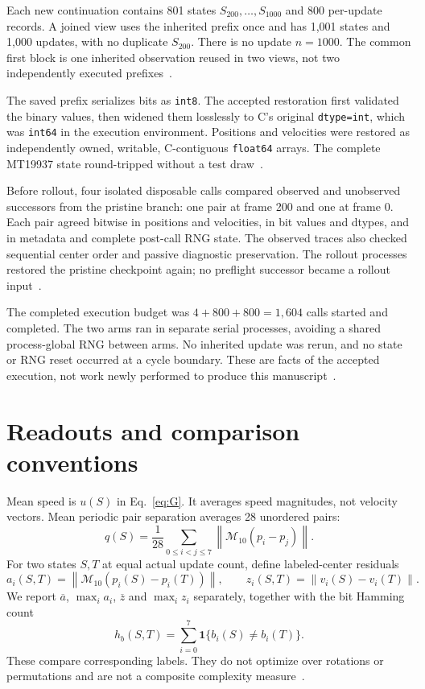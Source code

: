 \documentclass[11pt,a4paper]{article}
\newcommand{\norm}[1]{\left\lVert #1\right\rVert}
\newcommand{\mi}{\mathcal M_{10}}
\begin{document}
Each new continuation contains 801 states $S_{200},\ldots,S_{1000}$ and 800 per-update records. A joined view uses the inherited prefix once and has 1,001 states and 1,000 updates, with no duplicate $S_{200}$. There is no update $n=1000$. The common first block is one inherited observation reused in two views, not two independently executed prefixes~\cite{sim02}.

The saved prefix serializes bits as \texttt{int8}. The accepted restoration first validated the binary values, then widened them losslessly to C's original \texttt{dtype=int}, which was \texttt{int64} in the execution environment. Positions and velocities were restored as independently owned, writable, C-contiguous \texttt{float64} arrays. The complete MT19937 state round-tripped without a test draw~\cite{sim02,review}.

Before rollout, four isolated disposable calls compared observed and unobserved successors from the pristine branch: one pair at frame 200 and one at frame 0. Each pair agreed bitwise in positions and velocities, in bit values and dtypes, and in metadata and complete post-call RNG state. The observed traces also checked sequential center order and passive diagnostic preservation. The rollout processes restored the pristine checkpoint again; no preflight successor became a rollout input~\cite{sim02,review}.

The completed execution budget was $4+800+800=1{,}604$ calls started and completed. The two arms ran in separate serial processes, avoiding a shared process-global RNG between arms. No inherited update was rerun, and no state or RNG reset occurred at a cycle boundary. These are facts of the accepted execution, not work newly performed to produce this manuscript~\cite{sim02}.

\section{Readouts and comparison conventions}
\label{sec:measure}
Mean speed is $u(S)$ in Eq.~\eqref{eq:G}. It averages speed magnitudes, not velocity vectors. Mean periodic pair separation averages 28 unordered pairs:
\begin{equation}
 q(S)=\frac1{28}\sum_{0\leq i<j\leq7}\norm{\mi(p_i-p_j)}.
 \label{eq:pair}
\end{equation}
For two states $S,T$ at equal actual update count, define labeled-center residuals
\begin{equation}
 a_i(S,T)=\norm{\mi(p_i(S)-p_i(T))},\qquad
 z_i(S,T)=\norm{v_i(S)-v_i(T)}.
 \label{eq:residual}
\end{equation}
We report $\overline a$, $\max_i a_i$, $\overline z$ and $\max_i z_i$ separately, together with the bit Hamming count
\begin{equation}
 h_b(S,T)=\sum_{i=0}^7\mathbf1\{b_i(S)\ne b_i(T)\}.
 \label{eq:hamming}
\end{equation}
These compare corresponding labels. They do not optimize over rotations or permutations and are not a composite complexity measure~\cite{sim02,records}.
\end{document}
